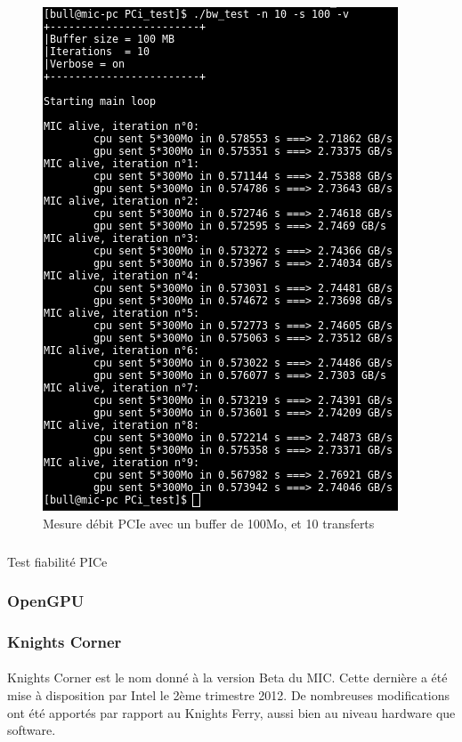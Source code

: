 \documentclass{article}
\begin{document}
					\begin{figure}
					\begin{center}
					\includegraphics[scale=0.4]{bwtest.png}
					\caption{Mesure débit PCIe avec un buffer de 100Mo, et 10 transferts}
					\end{center}
					\end{figure}
					\subparagraph{}
					Test fiabilité PICe
			\subsubsection{OpenGPU}
			\subsubsection{Knights Corner}
				\paragraph{}
				Knights Corner est le nom donné à la version Beta du MIC. Cette dernière a été mise à disposition par Intel le 2ème trimestre 
				2012. De nombreuses modifications ont été apportés par rapport au Knights Ferry, aussi bien au niveau hardware que software. 
				
\end{document}
